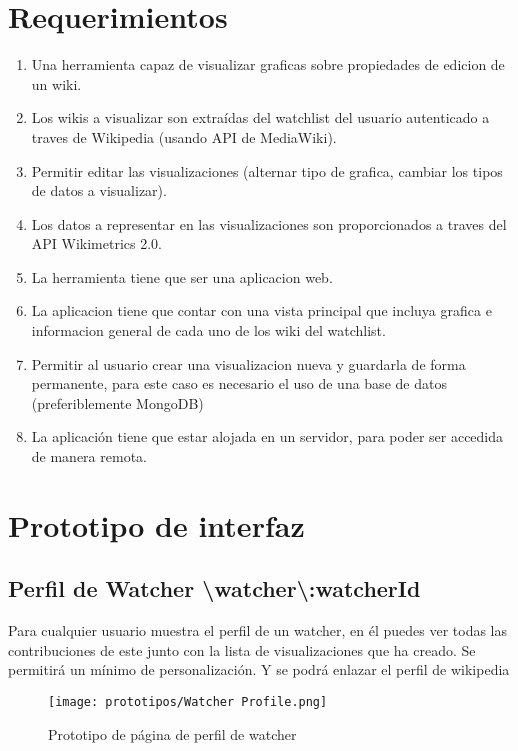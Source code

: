 \section{Requerimientos}
\begin{enumerate}
    \item{Una herramienta capaz de visualizar graficas sobre propiedades de edicion de un wiki.}
    \item{Los wikis a visualizar son extraídas del watchlist del usuario autenticado a traves de Wikipedia (usando API de MediaWiki).}
    \item{Permitir editar las visualizaciones (alternar tipo de grafica, cambiar los tipos de datos a visualizar).}
    \item{Los datos a representar en las visualizaciones son proporcionados a traves del API Wikimetrics 2.0.}
    \item{La herramienta tiene que ser una aplicacion web.}
    \item{La aplicacion tiene que contar con una vista principal que incluya grafica e informacion general de cada uno de los wiki del watchlist.}
    \item{Permitir al usuario crear una visualizacion nueva y guardarla de forma permanente, para este caso es necesario el uso de una base de datos (preferiblemente MongoDB)}
    \item{La aplicación tiene que estar alojada en un servidor, para poder ser accedida de manera remota.}
\end{enumerate}

\section{Prototipo de interfaz}

\subsection{Perfil de Watcher \textbackslash watcher\textbackslash:watcherId}
Para cualquier usuario muestra el perfil de un watcher, en él puedes ver todas las contribuciones de este junto con la lista de visualizaciones que ha creado.
Se permitirá un mínimo de personalización. Y se podrá enlazar el perfil de wikipedia

\begin{figure}[H]
    \centering
    \texttt{[image: prototipos/Watcher Profile.png]}
    \caption{Prototipo de página de perfil de watcher}
    \label{PrototipoWatchersProfile}
\end{figure}

